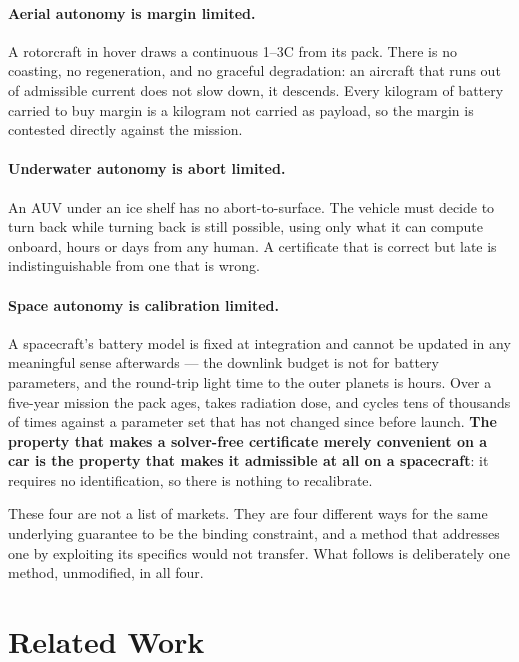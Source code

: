 \documentclass[11pt,letterpaper]{article}
\theoremstyle{definition}
\theoremstyle{remark}
\begin{document}
\paragraph{Aerial autonomy is margin limited.} A rotorcraft in hover draws a continuous
1--3C from its pack. There is no coasting, no regeneration, and no graceful degradation: an
aircraft that runs out of admissible current does not slow down, it descends. Every kilogram of
battery carried to buy margin is a kilogram not carried as payload, so the margin is contested
directly against the mission.

\paragraph{Underwater autonomy is abort limited.} An AUV under an ice shelf has no
abort-to-surface. The vehicle must decide to turn back while turning back is still possible,
using only what it can compute onboard, hours or days from any human. A certificate that is
correct but late is indistinguishable from one that is wrong.

\paragraph{Space autonomy is calibration limited.} A spacecraft's battery model is fixed at
integration and cannot be updated in any meaningful sense afterwards --- the downlink budget is
not for battery parameters, and the round-trip light time to the outer planets is hours. Over a
five-year mission the pack ages, takes radiation dose, and cycles tens of thousands of times
against a parameter set that has not changed since before launch. \textbf{The property that
makes a solver-free certificate merely convenient on a car is the property that makes it
admissible at all on a spacecraft}: it requires no identification, so there is nothing to
recalibrate.

These four are not a list of markets. They are four different ways for the same underlying
guarantee to be the binding constraint, and a method that addresses one by exploiting its
specifics would not transfer. What follows is deliberately one method, unmodified, in all four.

\section{Related Work}\label{sec:related}
\end{document}
